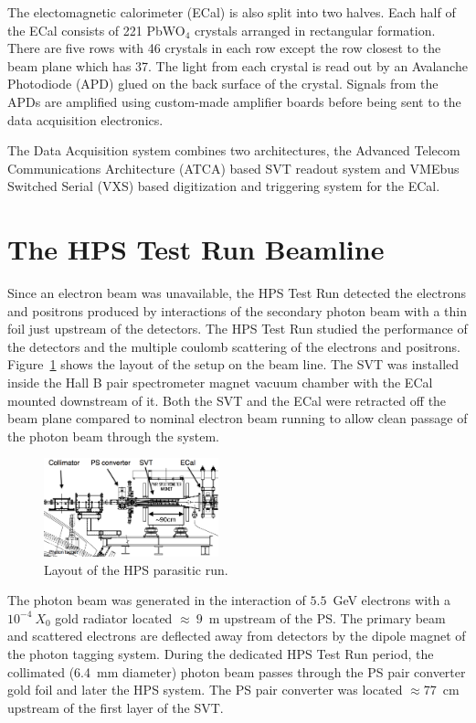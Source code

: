 \documentclass[final,3p,times,twocolumn]{elsarticle}
\begin{document}
The electomagnetic calorimeter (ECal) is also split into two halves. Each half of the ECal consists of 
221 PbWO$_4$ crystals arranged in rectangular formation. There are five rows with 46 crystals in 
each row except the row closest to the beam plane which has 37. The light from each crystal 
is read out by an Avalanche Photodiode (APD) glued on the back surface of the crystal. 
Signals from the APDs are amplified using custom-made amplifier boards before being sent to the 
data acquisition electronics.

The  Data Acquisition system combines two architectures, the Advanced Telecom Communications 
Architecture (ATCA) based SVT readout system and VMEbus Switched Serial (VXS) based digitization 
and triggering system for the ECal.





\section{The HPS Test Run Beamline}
Since an electron beam was unavailable, the HPS Test Run detected the electrons and positrons 
produced by interactions of the secondary photon beam with a thin foil just upstream of the detectors.  
The HPS Test Run studied the performance of the detectors and the multiple coulomb scattering of the 
electrons and positrons. Figure~\ref{fig:hpstest_layout} shows the layout of 
the setup on the beam line. The SVT was installed inside the Hall B pair 
spectrometer magnet vacuum chamber with the ECal mounted downstream of it. Both the 
SVT and the ECal were retracted off the beam plane compared to nominal electron beam running to 
allow clean passage of the photon beam through the system. 
\begin{figure}[]
    \includegraphics[width=0.45\textwidth]{hps-testrun-beamline-edited3}
\caption{\small{Layout of the HPS parasitic run.}
\label{fig:hpstest_layout}}
\end{figure}

The photon beam was generated in the interaction of $5.5$~GeV electrons with a $10^{-4}~X_0$ 
gold radiator located $\approx~9$~m upstream of the PS. The primary beam and scattered 
electrons are deflected away from detectors by the dipole magnet of the photon tagging system. 
During the dedicated HPS Test Run period, the collimated (6.4~mm diameter) photon beam passes 
through the PS pair converter gold foil and later the HPS system.
The PS pair converter was located $\approx$77~cm upstream of the first layer of the SVT.
 
\end{document}

